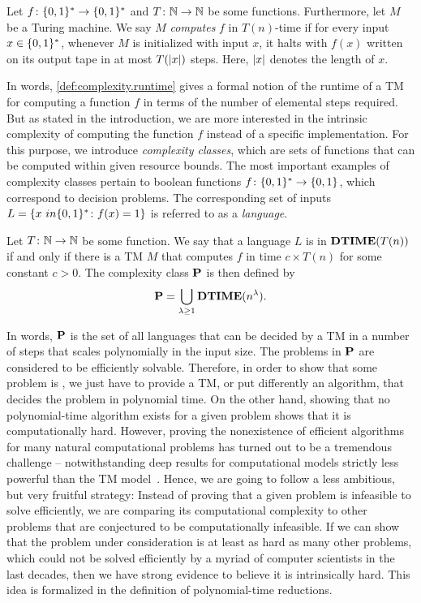 \begin{definition}{\cite[Def.\ 1.3]{Arora_2009_Computational}}%
  \label{def:complexity.runtime}
  Let $f\colon \BitStrings \to \BitStrings$ and $T\colon \Naturals \to \Naturals$ be some functions.
  Furthermore, let $M$ be a Turing machine.
  We say $M$ \emph{computes} $f$ in $T(n)$-time if for every input $x \in \BitStrings$, whenever $M$ is initialized with input $x$, it halts with $f(x)$ written on its output tape in at most $T(\abs{x})$ steps.
  Here, $\abs{x}$ denotes the length of $x$.
\end{definition}

In words, \cref{def:complexity.runtime} gives a formal notion of the runtime of a TM for computing a function $f$ in terms of the number of elemental steps required.
But as stated in the introduction, we are more interested in the intrinsic complexity of computing the function $f$ instead of a specific implementation.
For this purpose, we introduce \emph{complexity classes}, which are sets of functions that can be computed within given resource bounds.
The most important examples of complexity classes pertain to boolean functions $f\colon \BitStrings \to \{0, 1\}$, which correspond to decision problems.
The corresponding set of  inputs $L = \{x \ in \BitStrings\colon f(x) = 1\}$ is referred to as a \emph{language}.
\begin{definition}%
  \label{def:complexity.p}
  Let $T\colon \Naturals \to \Naturals$ be some function.
  We say that a language $L$ is in $\DTIME(T(n))$ if and only if there is a TM $M$ that computes $f$ in time $c \times T(n)$ for some constant $c > 0$.
  The complexity class $\P$ is then defined by
  \[
    \P = \bigcup_{\lambda \ge 1} \DTIME(n^\lambda).
  \]
\end{definition}
In words, $\P$ is the set of all languages that can be decided by a TM in a number of steps that scales polynomially in the input size.
The problems in $\P$ are considered to be efficiently solvable.
Therefore, in order to show that some problem is , we just have to provide a TM, or put differently an algorithm, that decides the problem in polynomial time.
On the other hand, showing that no polynomial-time algorithm exists for a given problem shows that it is computationally hard.
However, proving the nonexistence of efficient algorithms for many natural computational problems has turned out to be a tremendous challenge -- notwithstanding deep results for computational models strictly less powerful than the TM model~\cite[Part Two]{Arora_2009_Computational}.
Hence, we are going to follow a less ambitious, but very fruitful strategy:
Instead of proving that a given problem is infeasible to solve efficiently, we are comparing its computational complexity to other problems that are conjectured to be computationally infeasible.
If we can show that the problem under consideration is at least as hard as many other problems, which could not be solved efficiently by a myriad of computer scientists in the last decades, then we have strong evidence to believe it is intrinsically hard.
This idea is formalized in the definition of polynomial-time reductions.

